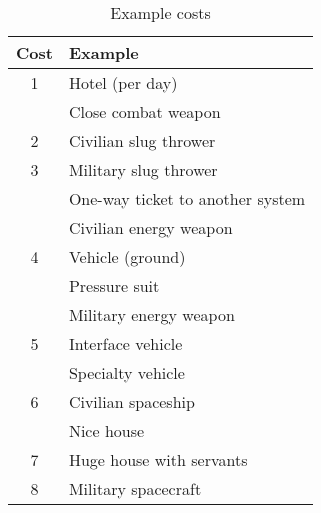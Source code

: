\begin{wraptable}[24]{r}[\sidebarwidth]{\halfbarwidth}
\begin{shadebox}{\halfbarinnerwidth}

\centering
\begin{tabular}{cp{0.75\halfbarinnerwidth}}
\toprule
Cost	& Example \\
\midrule 1
& Hotel (per day) \\
& Close combat weapon \\
\midrule 2
& Civilian slug thrower \\
\midrule 3
& Military slug thrower \\
& One-way ticket to another system \\
& Civilian energy weapon \\
\midrule 4
& Vehicle (ground) \\
& Pressure suit \\
& Military energy weapon \\
\midrule 5
& Interface vehicle \\
& Specialty vehicle \\
\midrule 6
& Civilian spaceship \\
& Nice house \\
\midrule 7
& Huge house with servants \\
\midrule 8
& Military spacecraft \\
\bottomrule
\end{tabular}
\end{shadebox}
\caption{Example costs}
\label{tab:example-costs}
\end{wraptable}
